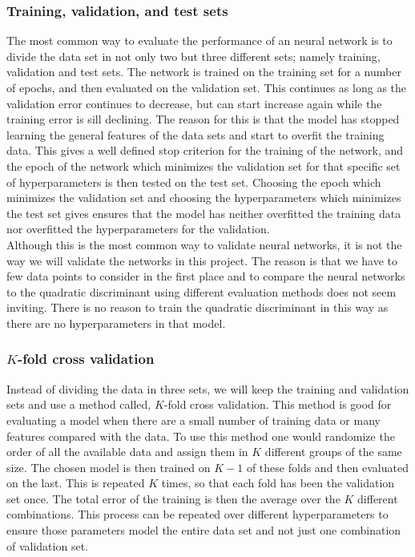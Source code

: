 \subsubsection{Training, validation, and test sets}

The most common way to evaluate the performance of an neural network is to divide the data set in not only two but three different sets; namely training, validation and test sets. The network is trained on the training set for a number of epochs, and then evaluated on the validation set. This continues as long as the validation error continues to decrease, but can start increase again while the training error is sill declining. The reason for this is that the model has stopped learning the general features of the data sets and start to overfit the training data. This gives a well defined stop criterion for the training of the network, and the epoch of the network which minimizes the validation set for that specific set of hyperparameters is then tested on the test set. Choosing the epoch which minimizes the validation set and choosing the hyperparameters which minimizes the test set gives ensures that the model has neither overfitted the training data nor overfitted the hyperparameters for the validation.\\

Although this is the most common way to validate neural networks, it is not the way we will validate the networks in this project. The reason is that we have to few data points to consider in the first place and to compare the neural networks to the quadratic discriminant using different evaluation methods does not seem inviting. There is no reason to train the quadratic discriminant in this way as there are no hyperparameters in that model.

\subsubsection{$K$-fold cross validation}

Instead of dividing the data in three sets, we will keep the training and validation sets and use a method called, $K$-fold cross validation. This method is good for evaluating a model when there are a small number of training data or many features compared with the data. To use this method one would randomize the order of all the available data and assign them in $K$ different groups of the same size. The chosen model is then trained on $K-1$ of these folds and then evaluated on the last. This is repeated $K$ times, so that each fold has been the validation set once. The total error of the training is then the average over the $K$ different combinations. This process can be repeated over different hyperparameters to ensure those parameters model the entire data set and not just one combination of validation set.

